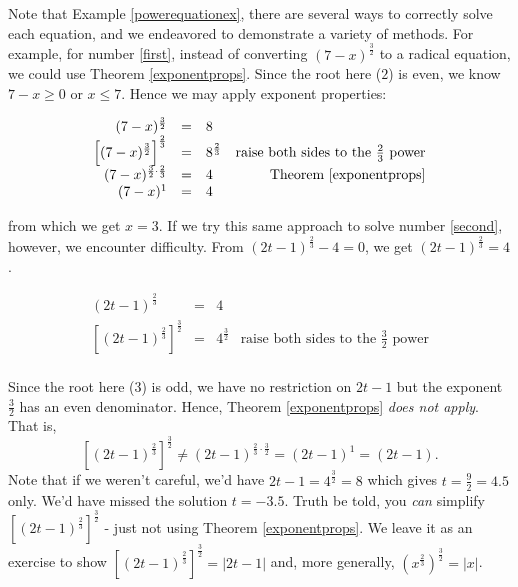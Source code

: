 \documentclass{ximera}
\begin{document}
Note that Example \ref{powerequationex}, there are several ways to correctly solve each equation, and we endeavored to demonstrate a variety of methods.  For example, for number \ref{first}, instead of converting $(7-x)^{\frac{3}{2}}$ to a radical equation, we could use Theorem \ref{exponentprops}.  Since the root here ($2$) is even, we know $7-x \geq 0$ or $x \leq 7$.  Hence we may apply exponent properties: 

\[ \begin{array}{rclr}  

(7-x)^{\frac{3}{2}} & = & 8 & \\

 \left[(7-x)^{\frac{3}{2}}\right]^{\frac{2}{3}} & = & 8^{\frac{2}{3}} & \text{raise both sides to the $\frac{2}{3}$ power} \\
 
 (7-x)^{\frac{3}{2} \cdot \frac{2}{3}} & = & 4 & \text{Theorem \ref{exponentprops}} \\
 
(7-x)^{1} & = & 4 \\ \end{array} \]

from which we get $x = 3$.  If we try this same approach to solve number \ref{second}, however, we encounter difficulty.  From $(2t-1)^{\frac{2}{3}} -4 = 0$, we get $(2t-1)^{\frac{2}{3}}  =4$.  

\[ \begin{array}{rclr}  

(2t-1)^{\frac{2}{3}} & = & 4 & \\

 \left[(2t-1)^{\frac{2}{3}}  \right]^{\frac{3}{2}} & = & 4^{\frac{3}{2}}& \text{raise both sides to the $\frac{3}{2}$ power} \\ \end{array} \]
 
 Since the root here ($3$) is odd, we have no restriction on $2t-1$ but the exponent $\frac{3}{2}$ has an even denominator.  Hence, Theorem \ref{exponentprops} \textit{does not apply}.  That is, \[\left[(2t-1)^{\frac{2}{3}}  \right]^{\frac{3}{2}} \neq (2t-1)^{\frac{2}{3} \cdot \frac{3}{2}} = (2t-1)^{1} = (2t-1).\]
 Note that if we weren't careful, we'd have $2t-1 = 4^{\frac{3}{2}} = 8$ which gives $t= \frac{9}{2} = 4.5$ only.   We'd have missed the solution $t = -3.5$.  Truth be told, you \textit{can} simplify $\left[(2t-1)^{\frac{2}{3}}  \right]^{\frac{3}{2}} $ - just not using Theorem \ref{exponentprops}.  We leave it as an exercise to show  $\left[(2t-1)^{\frac{2}{3}}  \right]^{\frac{3}{2}} = |2t-1|$ and, more generally, $\left(x^{\frac{2}{3}}\right)^{\frac{3}{2}} = |x|$.
 
\end{document}
